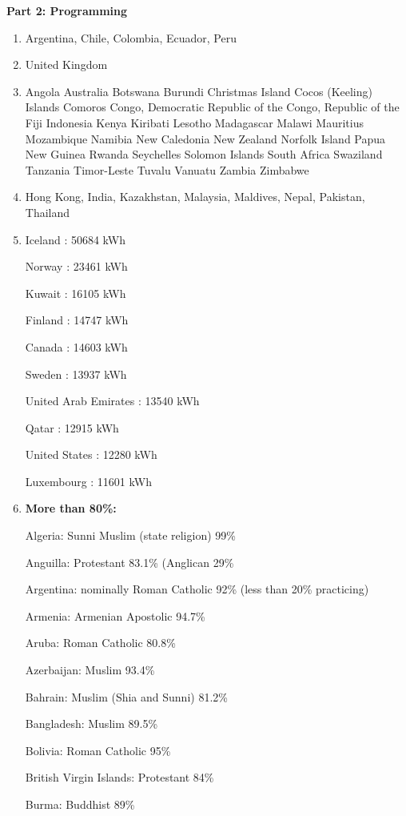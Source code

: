 \documentclass[letterpaper]{article}
\begin{document}
\newpage
\textbf{Part 2: Programming}
\begin{enumerate}
\item Argentina,
Chile,
Colombia,
Ecuador,
Peru

\item United Kingdom

\item Angola
Australia
Botswana
Burundi
Christmas Island
Cocos (Keeling) Islands
Comoros
Congo, Democratic Republic of the
Congo, Republic of the
Fiji
Indonesia
Kenya
Kiribati
Lesotho
Madagascar
Malawi
Mauritius
Mozambique
Namibia
New Caledonia
New Zealand
Norfolk Island
Papua New Guinea
Rwanda
Seychelles
Solomon Islands
South Africa
Swaziland
Tanzania
Timor-Leste
Tuvalu
Vanuatu
Zambia
Zimbabwe



\item Hong Kong,
India,
Kazakhstan,
Malaysia,
Maldives,
Nepal,
Pakistan,
Thailand

\item Iceland : 50684 kWh

Norway : 23461 kWh

Kuwait : 16105 kWh

Finland : 14747 kWh

Canada : 14603 kWh

Sweden : 13937 kWh

United Arab Emirates : 13540 kWh

Qatar : 12915 kWh

United States : 12280 kWh

Luxembourg : 11601 kWh

\item \textbf{More than 80\%:}

Algeria: Sunni Muslim (state religion) 99\%

Anguilla: Protestant 83.1\% (Anglican 29\%

Argentina: nominally Roman Catholic 92\% (less than 20\% practicing)

Armenia: Armenian Apostolic 94.7\%

Aruba: Roman Catholic 80.8\%

Azerbaijan: Muslim 93.4\%

Bahrain: Muslim (Shia and Sunni) 81.2\%

Bangladesh: Muslim 89.5\%

Bolivia: Roman Catholic 95\%

British Virgin Islands: Protestant 84\%

Burma: Buddhist 89\%


\end{enumerate}
\end{document}
